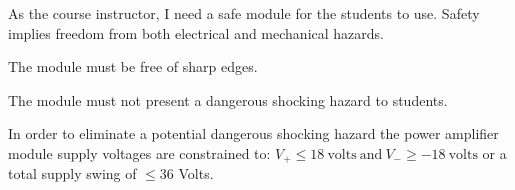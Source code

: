 As the course instructor, I need a safe module for the students to use.   Safety implies freedom from both electrical and mechanical hazards.
\bigskip
		
The module must be free of sharp edges.
\bigskip
		
The module must not present a dangerous shocking hazard to students.
\bigskip

In order to eliminate a potential dangerous shocking hazard the power amplifier module supply voltages are constrained to: $V_{+} \leq 18 \: \text{volts} \: \text{and} \: V_{-} \geq -18 \: \text{volts}$ or a total supply swing of $\leq 36$ Volts.
\bigskip